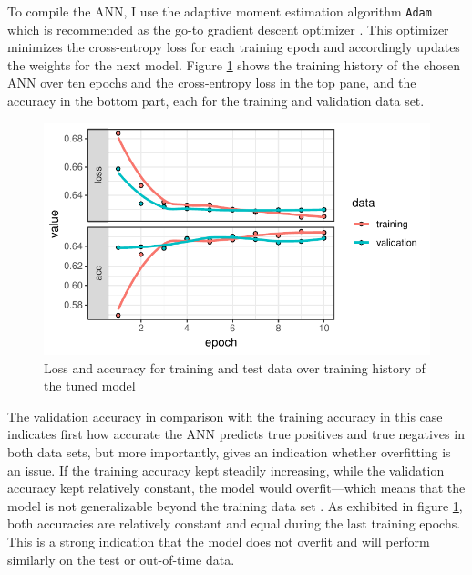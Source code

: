 \documentclass[12pt,a4paper]{article}
\let\code=\texttt
\begin{document}
To compile the ANN, I use the adaptive moment estimation algorithm \code{Adam} \citep{kingmaAdamMethodStochastic2014}
which is recommended as the go-to gradient descent optimizer \citep{ruderOverviewGradientDescent2016}.
This optimizer minimizes the cross-entropy loss \citep{zhangGeneralizedCrossEntropy2018} for each training epoch and accordingly updates the weights
for the next model.
Figure \ref{fig_history} shows the training history of the chosen ANN over ten epochs and the cross-entropy loss in the top pane, and the accuracy
in the bottom part, each for the training and validation data set.

\begin{figure}[ht]
	\centering
  \includegraphics[scale=0.8]{figures/train_history.pdf}
	\caption{Loss and accuracy for training and test data over training history of the tuned model}
	\label{fig_history}
\end{figure}
The validation accuracy in comparison with the training accuracy in this case indicates first how accurate the ANN predicts true positives 
and true negatives in both data sets, but more importantly, gives an indication whether overfitting is an issue.
If the training accuracy kept steadily increasing, while the validation accuracy kept relatively constant, the model would overfit---which means
that the model is not generalizable beyond the training data set \citep{hansenNeuralNetworkEnsembles1990}.
As exhibited in figure \ref{fig_history}, both accuracies are relatively constant and equal during the last training epochs.
This is a strong indication that the model does not overfit and will perform similarly on the test or out-of-time data.
\end{document}
